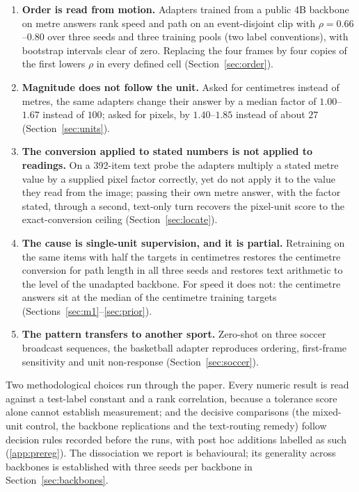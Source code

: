 \documentclass[preprint,number]{elsarticle}
\begin{document}
\begin{enumerate}
\item \textbf{Order is read from motion.} Adapters trained from a public 4B
  backbone on metre answers rank speed and path on an event-disjoint clip with
  $\rho=0.66$--$0.80$ over three seeds and three training pools (two label conventions), with
  bootstrap intervals clear of zero. Replacing the four frames by four copies of
  the first lowers $\rho$ in every defined cell (Section~\ref{sec:order}).
\item \textbf{Magnitude does not follow the unit.} Asked for centimetres
  instead of metres, the same adapters change their answer by a median factor
  of $1.00$--$1.67$ instead of $100$; asked for pixels, by $1.40$--$1.85$ instead
  of about $27$ (Section~\ref{sec:units}).
\item \textbf{The conversion applied to stated numbers is not applied to
  readings.} On a 392-item text probe the adapters multiply a stated metre
  value by a supplied pixel factor correctly, yet do not apply it to the value
  they read from the image; passing their own metre answer, with the factor
  stated, through a second, text-only turn recovers the pixel-unit score to
  the exact-conversion ceiling (Section~\ref{sec:locate}).
\item \textbf{The cause is single-unit supervision, and it is partial.}
  Retraining on the same items with half the targets in centimetres restores the
  centimetre conversion for path length in all three seeds and restores text
  arithmetic to the level of the unadapted backbone. For speed it does not: the
  centimetre answers sit at the median of the centimetre training targets
  (Sections~\ref{sec:m1}--\ref{sec:prior}).
\item \textbf{The pattern transfers to another sport.} Zero-shot on three
  soccer broadcast sequences, the basketball adapter reproduces ordering,
  first-frame sensitivity and unit non-response (Section~\ref{sec:soccer}).
\end{enumerate}

Two methodological choices run through the paper. Every numeric result is read
against a test-label constant and a rank correlation, because a tolerance score
alone cannot establish measurement; and the decisive comparisons (the mixed-unit
control, the backbone replications and the text-routing remedy) follow decision
rules recorded before the runs, with post hoc additions labelled as such
(\ref{app:prereg}). The dissociation we report is behavioural; its generality
across backbones is established with three seeds per backbone in
Section~\ref{sec:backbones}.
\end{document}
